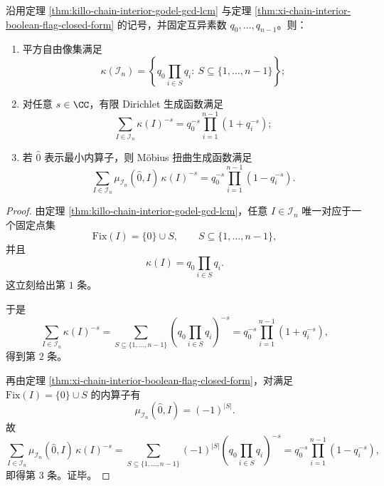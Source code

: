 \begin{theorem}\label{thm:xi-chain-interior-godel-euler-mobius-factorization}
沿用定理 \ref{thm:killo-chain-interior-godel-gcd-lcm} 与定理 \ref{thm:xi-chain-interior-boolean-flag-closed-form} 的记号，并固定互异素数 \(q_0,\dots,q_{n-1}\)。则：
\begin{enumerate}
  \item 平方自由像集满足
  \[
  \kappa(\mathcal I_n)
  =
  \left\{
  q_0\prod_{i\in S}q_i:\ S\subseteq\{1,\dots,n-1\}
  \right\};
  \]
  \item 对任意 \(s\in\CC\)，有限 Dirichlet 生成函数满足
  \[
  \sum_{I\in\mathcal I_n}\kappa(I)^{-s}
  =
  q_0^{-s}\prod_{i=1}^{n-1}(1+q_i^{-s});
  \]
  \item 若 \(\widehat 0\) 表示最小内算子，则 Möbius 扭曲生成函数满足
  \[
  \sum_{I\in\mathcal I_n}\mu_{\mathcal I_n}(\widehat 0,I)\,\kappa(I)^{-s}
  =
  q_0^{-s}\prod_{i=1}^{n-1}(1-q_i^{-s}).
  \]
\end{enumerate}
\end{theorem}
\begin{proof}
由定理 \ref{thm:killo-chain-interior-godel-gcd-lcm}，任意 \(I\in\mathcal I_n\) 唯一对应于一个固定点集
\[
\mathrm{Fix}(I)=\{0\}\cup S,
\qquad
S\subseteq\{1,\dots,n-1\},
\]
并且
\[
\kappa(I)=q_0\prod_{i\in S}q_i.
\]
这立刻给出第 \(1\) 条。

于是
\[
\sum_{I\in\mathcal I_n}\kappa(I)^{-s}
=
\sum_{S\subseteq\{1,\dots,n-1\}}
\left(q_0\prod_{i\in S}q_i\right)^{-s}
=
q_0^{-s}\prod_{i=1}^{n-1}(1+q_i^{-s}),
\]
得到第 \(2\) 条。

再由定理 \ref{thm:xi-chain-interior-boolean-flag-closed-form}，对满足 \(\mathrm{Fix}(I)=\{0\}\cup S\) 的内算子有
\[
\mu_{\mathcal I_n}(\widehat 0,I)=(-1)^{|S|}.
\]
故
\[
\sum_{I\in\mathcal I_n}\mu_{\mathcal I_n}(\widehat 0,I)\,\kappa(I)^{-s}
=
\sum_{S\subseteq\{1,\dots,n-1\}}
(-1)^{|S|}
\left(q_0\prod_{i\in S}q_i\right)^{-s}
=
q_0^{-s}\prod_{i=1}^{n-1}(1-q_i^{-s}),
\]
即得第 \(3\) 条。证毕。
\end{proof}

